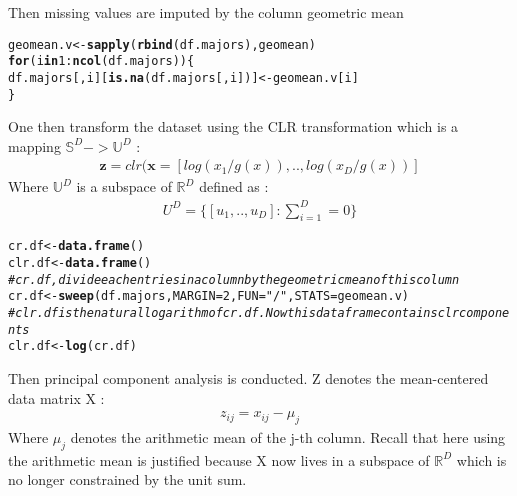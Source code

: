 \documentclass[a4paper,oneside,12pt,titlepage]{article}\usepackage[]{graphicx}\usepackage[]{color}
\makeatletter
\newcommand{\hlnum}[1]{\textcolor[rgb]{0.686,0.059,0.569}{#1}}%
\newcommand{\hlstr}[1]{\textcolor[rgb]{0.192,0.494,0.8}{#1}}%
\newcommand{\hlcom}[1]{\textcolor[rgb]{0.678,0.584,0.686}{\textit{#1}}}%
\newcommand{\hlopt}[1]{\textcolor[rgb]{0,0,0}{#1}}%
\newcommand{\hlstd}[1]{\textcolor[rgb]{0.345,0.345,0.345}{#1}}%
\newcommand{\hlkwa}[1]{\textcolor[rgb]{0.161,0.373,0.58}{\textbf{#1}}}%
\newcommand{\hlkwb}[1]{\textcolor[rgb]{0.69,0.353,0.396}{#1}}%
\newcommand{\hlkwc}[1]{\textcolor[rgb]{0.333,0.667,0.333}{#1}}%
\newcommand{\hlkwd}[1]{\textcolor[rgb]{0.737,0.353,0.396}{\textbf{#1}}}%
\newenvironment{kframe}{%
 \def\at@end@of@kframe{}%
 \ifinner\ifhmode%
  \def\at@end@of@kframe{\end{minipage}}%
  \begin{minipage}{\columnwidth}%
 \fi\fi%
 \def\FrameCommand##1{\hskip\@totalleftmargin \hskip-\fboxsep
 \colorbox{shadecolor}{##1}\hskip-\fboxsep
     \hskip-\linewidth \hskip-\@totalleftmargin \hskip\columnwidth}%
 \MakeFramed {\advance\hsize-\width
   \@totalleftmargin\z@ \linewidth\hsize
   \@setminipage}}%
 {\par\unskip\endMakeFramed%
 \at@end@of@kframe}
\newenvironment{knitrout}{}{} %
\makeatother
\begin{document}
Then  missing values are imputed by the column geometric mean
\begin{knitrout}
\color{fgcolor}\begin{kframe}
\begin{alltt}
\hlstd{geomean.v} \hlkwb{<-} \hlkwd{sapply}\hlstd{(}\hlkwd{rbind}\hlstd{(df.majors),geomean)}
\hlkwa{for} \hlstd{(i} \hlkwa{in} \hlnum{1}\hlopt{:}\hlkwd{ncol}\hlstd{(df.majors))\{}
  \hlstd{df.majors[,i][}\hlkwd{is.na}\hlstd{(df.majors[,i])]} \hlkwb{<-} \hlstd{geomean.v[i]}
\hlstd{\}}
\end{alltt}
\end{kframe}
\end{knitrout}

\noindent One then transform the dataset using the CLR transformation which is a mapping  $\mathbb{S}^D -> \mathbb{U}^D$ :
\begin{align}
\mathbf{z} = clr(\mathbf{x} = [log(x_1/g(x)),..,log(x_D/g(x))]
\end{align}
Where $\mathbb{U}^D$ is a subspace of $\mathbb{R}^D$ defined as : 
\begin{align*}
U^D = \Big\{[u_1,..,u_D] : \sum_{i=1}^D = 0  \Big\}
\end{align*}

\begin{knitrout}
\color{fgcolor}\begin{kframe}
\begin{alltt}
\hlstd{cr.df} \hlkwb{<-} \hlkwd{data.frame}\hlstd{()}
\hlstd{clr.df} \hlkwb{<-} \hlkwd{data.frame}\hlstd{()}
\hlcom{# cr.df, divide each entries in a column by the geometric mean of this column}
\hlstd{cr.df} \hlkwb{<-} \hlkwd{sweep}\hlstd{(df.majors,}\hlkwc{MARGIN} \hlstd{=} \hlnum{2}\hlstd{,}\hlkwc{FUN}\hlstd{=}\hlstr{"/"}\hlstd{,}\hlkwc{STATS} \hlstd{= geomean.v)}
\hlcom{# clr.df is the natural logarithm of cr.df. Now this dataframe contains clr components}
\hlstd{clr.df} \hlkwb{<-} \hlkwd{log}\hlstd{(cr.df)}
\end{alltt}
\end{kframe}
\end{knitrout}
Then principal component analysis is conducted.
Z denotes the mean-centered data matrix X :  
\begin{align*}
z_{ij} = x_{ij} - \mu_j
\end{align*}
Where $\mu_j$ denotes the arithmetic mean of the j-th column. Recall that here using the arithmetic mean is justified because X now lives in a subspace of $\mathbb{R}^D$ which is no longer constrained by the unit sum.
\end{document}
